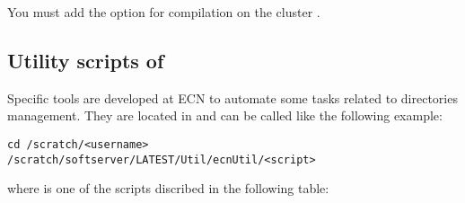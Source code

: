 You must add the option  for compilation
 on the cluster .


\subsection{Utility scripts of }\label{ecnUtil} 


Specific tools are developed at ECN to automate some tasks related
to directories management. They are located in
 and can be called
like the following example:
\begin{verbatim}
cd /scratch/<username>
/scratch/softserver/LATEST/Util/ecnUtil/<script>
\end{verbatim}

where  is one of the scripts discribed in the
following table:

